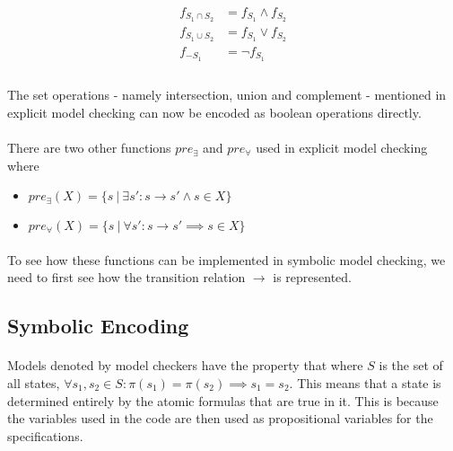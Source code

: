 \documentclass{article}
\theoremstyle{plain}
\theoremstyle{definition}
\begin{document}
\begin{multicols}{2}
\begin{align*}
f_{S_1 \cap S_2} &= f_{S_1} \land f_{S_2} \\
f_{S_1 \cup S_2} &= f_{S_1} \lor f_{S_2} \\
f_{-S_1} &= \lnot f_{S_1} \\
\end{align*}

\paragraph{} The set operations - namely intersection, union and complement - mentioned in explicit model checking can now be encoded as boolean operations directly. 

\paragraph{} There are two other functions $pre_\exists$ and $pre_\forall$ used in explicit model checking where

\begin{itemize}
\item $pre_\exists(X) = \{ s\ |\ \exists s': s \rightarrow s' \land s \in X \}$
\item $pre_\forall(X) = \{ s\ |\ \forall s': s \rightarrow s' \implies s \in X \}$
\end{itemize}

\paragraph{} To see how these functions can be implemented in symbolic model checking, we need to first see how the transition relation $\rightarrow$ is represented.

\subsection{Symbolic Encoding}\label{sec:SymbolicEncoding}

\paragraph{} Models denoted by model checkers have the property that where $S$ is the set of all states, $\forall s_1, s_2 \in S: \pi(s_1) = \pi(s_2) \implies s_1 = s_2$. This means that a state is determined entirely by the atomic formulas that are true in it. This is because the variables used in the code are then used as propositional variables for the specifications.


\end{multicols}
\end{document}
